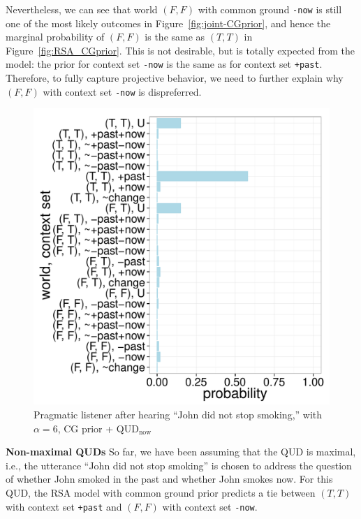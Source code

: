 Nevertheless, we can see that world $(F, F)$ with common ground \verb=-now= 
 is still one of the most likely outcomes in Figure~\ref{fig:joint-CGprior}, and
 hence the marginal probability of $(F, F)$ is the same as $(T, T)$ in Figure~\ref{fig:RSA_CGprior}.
This is not desirable, but is totally expected from the model: 
 the prior for context set \verb=-now= is the same as for context set \verb=+past=. 
Therefore, to fully capture projective behavior, we need to further
 explain why $(F, F)$ with context set \verb=-now= is dispreferred.


\begin{figure}
 \includegraphics[scale=0.4]{figs/joint_CGprior_QUDnow.pdf}
 \caption{Pragmatic listener after hearing ``John did not stop smoking,'' with $\alpha=6$, CG prior + QUD$_\text{now}$\label{fig:joint-QUDnow}}
\vspace{-3ex}
\end{figure}

\vspace{1ex}
\noindent\textbf{Non-maximal QUDs} \quad
So far, we have been assuming that the QUD is maximal, i.e., the utterance 
 ``John did not stop smoking'' is chosen to address the question of
 whether John smoked in the past and whether John smokes now.
For this QUD, the RSA model with common ground prior predicts a tie between 
 $(T, T)$ with context set \verb=+past= and
 $(F, F)$ with context set \verb=-now=.
 
